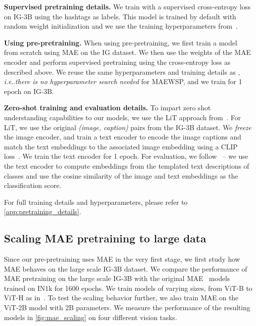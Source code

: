 \documentclass[10pt,twocolumn,letterpaper]{article}
\makeatletter
\DeclareRobustCommand\onedot{\futurelet\@let@token\@onedot}
\def\@onedot{\ifx\@let@token.\else.\null\fi\xspace}
\def\ie{\emph{i.e}\onedot} \def\Ie{\emph{I.e}\onedot}
\newcommand{\prept}{pre-pretraining\xspace}
\newcommand{\lit}{LiT\xspace}
\newcommand{\mae}{MAE\xspace}
\newcommand{\ours}{MAEWSP\xspace}  \newcommand{\oursig}{\ours{}\textsubscript{IG}\xspace}
\newcommand{\clip}{CLIP\xspace}
\newcommand{\vitB}{ViT-B\xspace}
\newcommand{\vitH}{ViT-H\xspace}
\newcommand{\vitTwoB}{ViT-2B\xspace}
\newcommand{\igShort}{IG\xspace}
\newcommand{\igSizeShort}{IG-3B\xspace}
\newcommand{\inetOneKShort}{IN1k\xspace}
\makeatother
\begin{document}
\par \noindent \textbf{Supervised pretraining details.}
We train with a supervised cross-entropy loss on \igSizeShort using the hashtags as labels.
This model is trained by default with random weight initialization and we use the training hyperparameters from~\cite{singh2022revisiting}.
\par \noindent \textbf{Using \prept.}
When using \prept, we first train a model from scratch using \mae on the \igShort dataset.
We then use the weights of the \mae encoder and perform supervised pretraining using the cross-entropy loss as described above.
We reuse the same hyperparameters and training details as
\cite{singh2022revisiting}, \ie \emph{there is no hyperparameter search needed} for \ours, and we train for 1 epoch on
\igSizeShort. 


\par \noindent \textbf{Zero-shot training and evaluation details.}
To impart zero shot understanding capabilities to our models, we use the \lit approach from~\cite{zhai2022lit}.
For \lit, we use the original \emph{(image, caption)} pairs from the \igSizeShort dataset.
We \emph{freeze} the image encoder, and train a text encoder to encode the image captions and match the text embeddings to the associated image embedding using a \clip loss~\cite{radford2021learning}.
We train the text encoder for 1 epoch.
For evaluation, we follow~\cite{radford2021learning} -- we use the text encoder to compute embeddings from the templated text descriptions of classes and use the cosine similarity of the image and text embeddings as the classification score.

For full training details and hyperparameters, please refer to \cref{app:pretraining_details}.


 



\subsection{Scaling \mae pretraining to large data}
\label{sec:mae-scale}

Since our \prept uses \mae in the very first stage, we first study how \mae behaves on the large scale \igSizeShort dataset.
We compare the performance of \mae pretraining on the large scale \igSizeShort with the original \mae~\cite{he2021masked} models 
trained on \inetOneKShort for 1600 epochs.
We train models of varying sizes, from \vitB to \vitH as in~\cite{he2021masked}.
To test the scaling behavior further, we also train \mae on the \vitTwoB model with 2B parameters.
We measure the performance of the resulting models in
\cref{fig:mae_scaling} on four different vision tasks.
\end{document}
